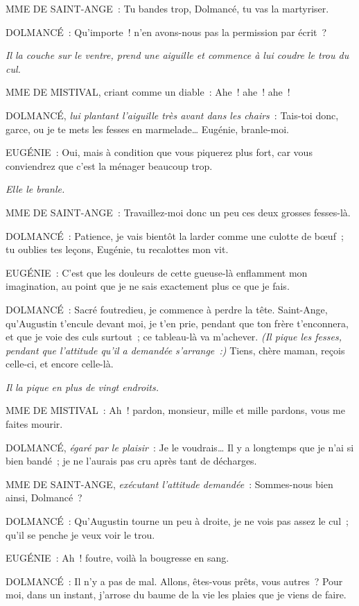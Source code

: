 \documentclass[french,twoside]{book} %
\begin{document}
MME DE SAINT-ANGE : Tu bandes trop, Dolmancé, tu vas la martyriser.\par
DOLMANCÉ : Qu’importe ! n’en avons-nous pas la permission par écrit ?\par
{\itshape Il la couche sur le ventre, prend une aiguille et commence à lui coudre le trou du cul.}\par
MME DE MISTIVAL, criant comme un diable : Ahe ! ahe ! ahe !\par
DOLMANCÉ, {\itshape lui plantant l’aiguille très avant dans les chairs} : Tais-toi donc, garce, ou je te mets les fesses en marmelade… Eugénie, branle-moi.\par
EUGÉNIE : Oui, mais à condition que vous piquerez plus fort, car vous conviendrez que c’est la ménager beaucoup trop.\par
{\itshape Elle le branle.}\par
MME DE SAINT-ANGE : Travaillez-moi donc un peu ces deux grosses fesses-là.\par
DOLMANCÉ : Patience, je vais bientôt la larder comme une culotte de bœuf ; tu oublies tes leçons, Eugénie, tu recalottes mon vit.\par
EUGÉNIE : C’est que les douleurs de cette gueuse-là enflamment mon imagination, au point que je ne sais exactement plus ce que je fais.\par
DOLMANCÉ : Sacré foutredieu, je commence à perdre la tête. Saint-Ange, qu’Augustin t’encule devant moi, je t’en prie, pendant que ton frère t’enconnera, et que je voie des culs surtout ; ce tableau-là va m’achever. {\itshape (Il pique les fesses, pendant que l’attitude qu’il a demandée s’arrange :)} Tiens, chère maman, reçois celle-ci, et encore celle-là.\par
{\itshape Il la pique en plus de vingt endroits.}\par
MME DE MISTIVAL : Ah ! pardon, monsieur, mille et mille pardons, vous me faites mourir.\par
DOLMANCÉ, {\itshape égaré par le plaisir} : Je le voudrais… Il y a longtemps que je n’ai si bien bandé ; je ne l’aurais pas cru après tant de décharges.\par
MME DE SAINT-ANGE, {\itshape exécutant l’attitude demandée} : Sommes-nous bien ainsi, Dolmancé ?\par
DOLMANCÉ : Qu’Augustin tourne un peu à droite, je ne vois pas assez le cul ; qu’il se penche je veux voir le trou.\par
EUGÉNIE : Ah ! foutre, voilà la bougresse en sang.\par
DOLMANCÉ : Il n’y a pas de mal. Allons, êtes-vous prêts, vous autres ? Pour moi, dans un instant, j’arrose du baume de la vie les plaies que je viens de faire.\par
\end{document}

